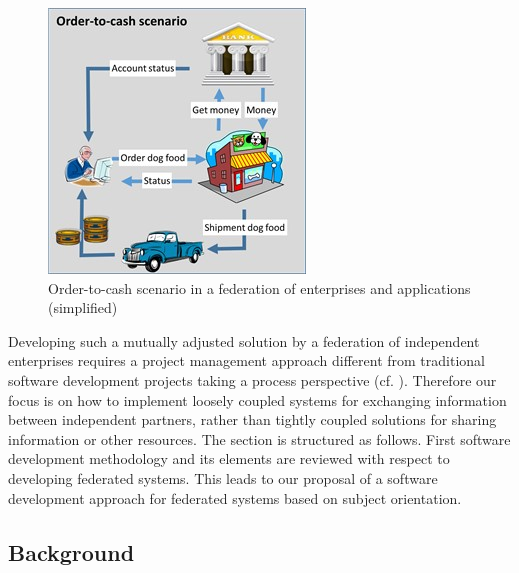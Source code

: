 \begin{figure}[htbp]
	\centering
	\includegraphics[width=0.6\linewidth] {Figures/Chapter5/Project/DogFoodShop.jpg}
	\caption[Order-to-cash scenario in a federation of enterprises and applications (simplified)]{Order-to-cash scenario in a federation of enterprises and applications (simplified)}
	\label{fig:DogFoodShop}
\end{figure}

Developing such a mutually adjusted solution by a federation of independent enterprises requires a project management approach different from traditional software development projects taking a process perspective (cf. \cite{book:ProjectHistory}). Therefore our focus is on how to implement loosely coupled systems for exchanging information between independent partners, rather than tightly coupled solutions for sharing information or other resources.
The section is structured as follows. First software development methodology and its elements are reviewed with respect to developing federated systems. This leads to our proposal of a software development approach for federated systems based on subject orientation.
\\
\subsection{Background}

